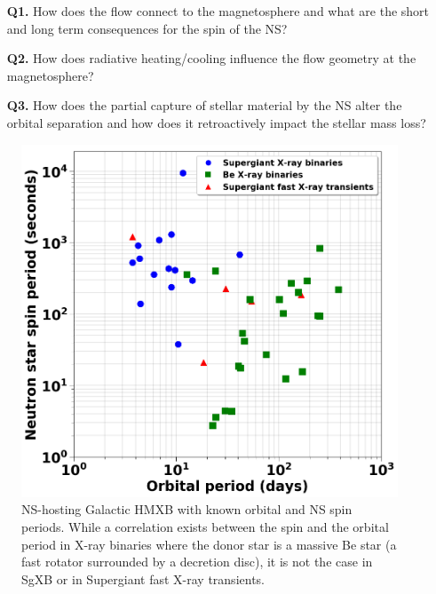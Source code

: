 \documentclass[letterpaper,12pt,onecolumn]{article}
\makeatletter
\newcommand{\sgx}{SgXB\xspace}
\newcommand*{\hmxb}{HMXB\@\xspace}
\newcommand*{\ns}{NS\@\xspace}
\makeatother
\begin{document}

%

\begin{enumerate}
\item[\textbf{Q1.}] How does the flow connect to the magnetosphere and what are the short and long term consequences for the spin of the \ns? 
\item[\textbf{Q2.}] How does radiative heating/cooling influence the flow geometry at the magnetosphere?
\item[\textbf{Q3.}] How does the partial capture of stellar material by the \ns alter the orbital separation and how does it retroactively impact the stellar mass loss?
\end{enumerate}

\begin{figure}[!h]
\centering
\includegraphics[width=0.7\columnwidth]{Figures/corbet_diag.png}
\caption{\ns-hosting Galactic \hmxb with known orbital and \ns spin periods. While a correlation exists between the spin and the orbital period in X-ray binaries where the donor star is a massive Be star (a fast rotator surrounded by a decretion disc), it is not the case in \sgx or in Supergiant fast X-ray transients.}
\label{fig:spin}
\end{figure} 
\end{document}
